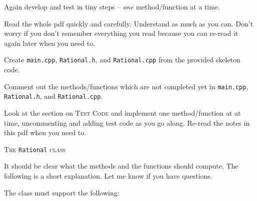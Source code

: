 Again develop and test in tiny steps -- \textit{one} method/function at a time.

\begin{tightlist}
  \item Read the whole pdf quickly and carefully. Understand as much as
  you can. Don't worry if you don't remember everything you read
  because you can re-read it again later when you need to.
  \item Create \verb!main.cpp!, \verb!Rational.h!, and \verb!Rational.cpp!
  from the provided skeleton code.
  \item Comment out the methods/functions which are
  not completed yet in
  \verb!main.cpp!, \verb!Rational.h!, and \verb!Rational.cpp!.
  \item Look at the section on \textsc{Test Code} and implement
    one method/function at at time, uncommenting and adding test code
    as you go along. Re-read the notes in this pdf when you need to.
\end{tightlist}



\newpage
\textsc{The} \texttt{Rational} \textsc{class}

It should be clear what the methods and the functions should compute.
The following
is a short explanation. Let me know if you have questions.

The class must support the following:

